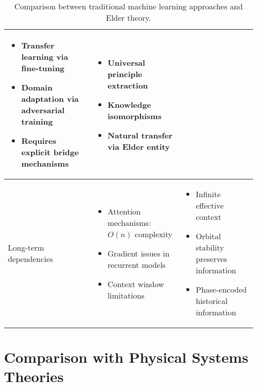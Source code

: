 \begin{table}[h]
\begin{tabular}{|p{3cm}|p{5cm}|p{5cm}|}
\begin{itemize}
    \item Transfer learning via fine-tuning
    \item Domain adaptation via adversarial training
    \item Requires explicit bridge mechanisms
\end{itemize} &
\begin{itemize}
    \item Universal principle extraction
    \item Knowledge isomorphisms
    \item Natural transfer via Elder entity
\end{itemize} \\
\hline
Long-term dependencies & 
\begin{itemize}
    \item Attention mechanisms: $O(n)$ complexity
    \item Gradient issues in recurrent models
    \item Context window limitations
\end{itemize} &
\begin{itemize}
    \item Infinite effective context
    \item Orbital stability preserves information
    \item Phase-encoded historical information
\end{itemize} \\
\hline
\end{tabular}
\caption{Comparison between traditional machine learning approaches and Elder theory.}
\label{tab:ml_comparison}
\end{table}

\section{Comparison with Physical Systems Theories}

